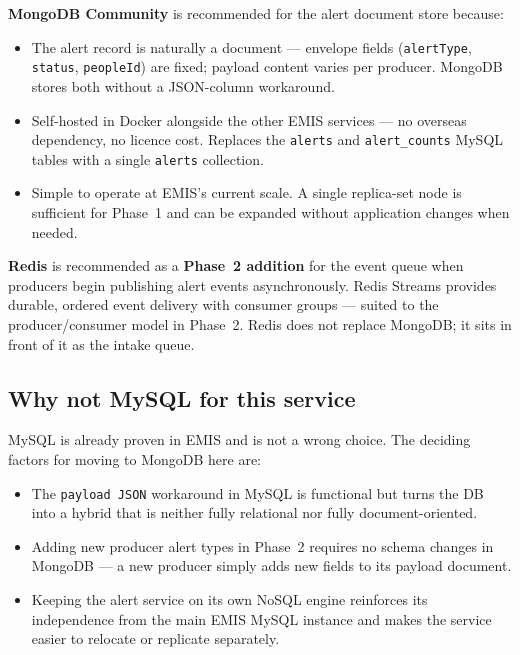 \documentclass[11pt]{article}
\begin{document}
\textbf{MongoDB Community} is recommended for the alert document store because:
\begin{itemize}
  \item The alert record is naturally a document --- envelope fields (\texttt{alertType},
        \texttt{status}, \texttt{peopleId}) are fixed; payload content varies per producer.
        MongoDB stores both without a JSON-column workaround.
  \item Self-hosted in Docker alongside the other EMIS services --- no overseas dependency,
        no licence cost. Replaces the \texttt{alerts} and \texttt{alert\_counts} MySQL tables
        with a single \texttt{alerts} collection.
  \item Simple to operate at EMIS's current scale. A single replica-set node is sufficient
        for Phase~1 and can be expanded without application changes when needed.
\end{itemize}

\textbf{Redis} is recommended as a \textbf{Phase~2 addition} for the event queue when producers
begin publishing alert events asynchronously. Redis Streams provides durable, ordered event
delivery with consumer groups --- suited to the producer/consumer model in Phase~2. Redis does
not replace MongoDB; it sits in front of it as the intake queue.

\subsection{Why not MySQL for this service}

MySQL is already proven in EMIS and is not a wrong choice. The deciding factors for moving to
MongoDB here are:
\begin{itemize}
  \item The \texttt{payload JSON} workaround in MySQL is functional but turns the DB into a
        hybrid that is neither fully relational nor fully document-oriented.
  \item Adding new producer alert types in Phase~2 requires no schema changes in MongoDB ---
        a new producer simply adds new fields to its payload document.
  \item Keeping the alert service on its own NoSQL engine reinforces its independence from the
        main EMIS MySQL instance and makes the service easier to relocate or replicate separately.
\end{itemize}

\end{document}

